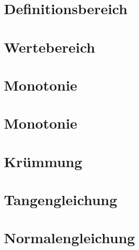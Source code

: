 \documentclass[10pt,a4paper]{article}
\begin{document}
\section*{Definitionsbereich}

\section*{Wertebereich}

\section*{Monotonie}

\section*{Monotonie}

\section*{Krümmung}

\section*{Tangengleichung}

\section*{Normalengleichung}
\end{document}
